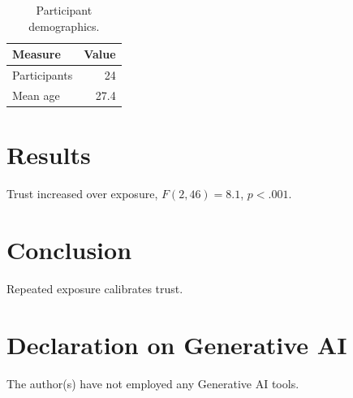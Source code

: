 \documentclass{ceurart}
\begin{document}
\begin{table}[t]
  \caption{Participant demographics.}
  \label{tab:demographics}
  \begin{tabular}{lr}
    \toprule
    Measure & Value \\
    \midrule
    Participants & 24 \\
    Mean age & 27.4 \\
    \bottomrule
  \end{tabular}
\end{table}

\section{Results}
Trust increased over exposure, $F(2,46) = 8.1$, $p < .001$.

\section{Conclusion}
Repeated exposure calibrates trust.

\section*{Declaration on Generative AI}
The author(s) have not employed any Generative AI tools.


\end{document}
